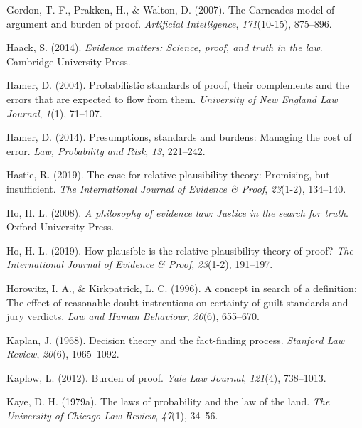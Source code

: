 \documentclass[10pt,dvipsnames]{scrartcl}
\begin{document}
\leavevmode\hypertarget{ref-gordon2007}{}%
Gordon, T. F., Prakken, H., \& Walton, D. (2007). The Carneades model of
argument and burden of proof. \emph{Artificial Intelligence},
\emph{171}(10-15), 875--896.

\leavevmode\hypertarget{ref-Haack2014-HAAEMS}{}%
Haack, S. (2014). \emph{Evidence matters: Science, proof, and truth in
the law}. Cambridge University Press.

\leavevmode\hypertarget{ref-hamer2004}{}%
Hamer, D. (2004). Probabilistic standards of proof, their complements
and the errors that are expected to flow from them. \emph{University of
New England Law Journal}, \emph{1}(1), 71--107.

\leavevmode\hypertarget{ref-hamer2014}{}%
Hamer, D. (2014). Presumptions, standards and burdens: Managing the cost
of error. \emph{Law, Probability and Risk}, \emph{13}, 221--242.

\leavevmode\hypertarget{ref-hastie2019CaseRelativePlausibilitya}{}%
Hastie, R. (2019). The case for relative plausibility theory: Promising,
but insufficient. \emph{The International Journal of Evidence \& Proof},
\emph{23}(1-2), 134--140.

\leavevmode\hypertarget{ref-ho2008philosophy}{}%
Ho, H. L. (2008). \emph{A philosophy of evidence law: Justice in the
search for truth}. Oxford University Press.

\leavevmode\hypertarget{ref-lai2019HowPlausibleRelative}{}%
Ho, H. L. (2019). How plausible is the relative plausibility theory of
proof? \emph{The International Journal of Evidence \& Proof},
\emph{23}(1-2), 191--197.

\leavevmode\hypertarget{ref-Horowitz1996}{}%
Horowitz, I. A., \& Kirkpatrick, L. C. (1996). A concept in search of a
definition: The effect of reasonable doubt instrcutions on certainty of
guilt standards and jury verdicts. \emph{Law and Human Behaviour},
\emph{20}(6), 655--670.

\leavevmode\hypertarget{ref-Kaplan1968decision}{}%
Kaplan, J. (1968). Decision theory and the fact-finding process.
\emph{Stanford Law Review}, \emph{20}(6), 1065--1092.

\leavevmode\hypertarget{ref-kaplow2012}{}%
Kaplow, L. (2012). Burden of proof. \emph{Yale Law Journal},
\emph{121}(4), 738--1013.

\leavevmode\hypertarget{ref-kaye79}{}%
Kaye, D. H. (1979a). The laws of probability and the law of the land.
\emph{The University of Chicago Law Review}, \emph{47}(1), 34--56.
\end{document}
